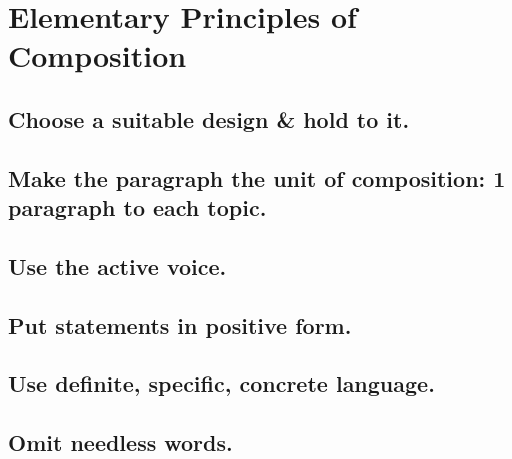 \documentclass{article}
\numberwithin{equation}{section}
\begin{document}

\section{Elementary Principles of Composition}

\subsection{Choose a suitable design \& hold to it.}


\subsection{Make the paragraph the unit of composition: 1 paragraph to each topic.}


\subsection{Use the active voice.}


\subsection{Put statements in positive form.}


\subsection{Use definite, specific, concrete  language.}


\subsection{Omit needless words.}

\end{document}
